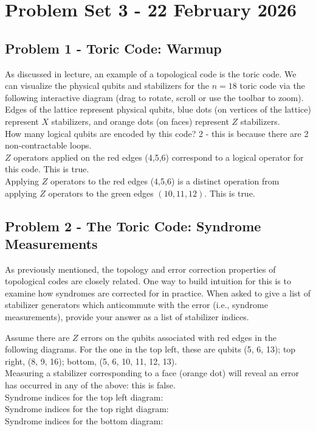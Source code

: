 \section{Problem Set 3 - 22 February 2026}
\subsection{Problem 1 - Toric Code: Warmup}
As discussed in lecture, an example of a topological code is the toric code. We can visualize the physical qubits and stabilizers for the $n=18$ toric code via the following interactive diagram (drag to rotate, scroll or use the toolbar to zoom). Edges of the lattice represent physical qubits, blue dots (on vertices of the lattice) represent $X$ stabilizers, and orange dots (on faces) represent $Z$ stabilizers. \\

How many logical qubits are encoded by this code? 2 - this is because there are 2 non-contractable loops. \\
$Z$ operators applied on the red edges (4,5,6) correspond to a logical operator for this code. This is true. \\
Applying $Z$ operators to the red edges (4,5,6) is a distinct operation from applying $Z$ operators to the green edges $(10,11,12)$. This is true.



\newpage
\subsection{Problem 2 - The Toric Code: Syndrome Measurements}
As previously mentioned, the topology and error correction properties of topological codes are closely related. One way to build intuition for this is to examine how syndromes are corrected for in practice. When asked to give a list of stabilizer generators which anticommute with the error (i.e., syndrome measurements), provide your answer as a list of stabilizer indices. 

Assume there are $Z$ errors on the qubits associated with red edges in the following diagrams. For the one in the top left, these are qubits (5, 6, 13); top right, (8, 9, 16); bottom, (5, 6, 10, 11, 12, 13). \\

Measuring a stabilizer corresponding to a face (orange dot) will reveal an error has occurred in any of the above: this is false. \\

Syndrome indices for the top left diagram: \\
Syndrome indices for the top right diagram: \\
Syndrome indices for the bottom diagram: \\



